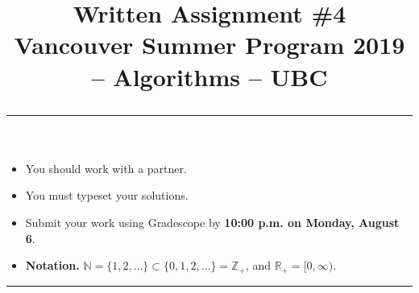 \documentclass[11pt]{article}
\title{
  Written Assignment \#4 \\[0.5em]
  \large
  Vancouver Summer Program 2019 -- Algorithms -- UBC \\
  \vspace*{0.2in} \hrule
}
\date{}
\newcommand{\R}{\mathbb{R}}
\newcommand{\Z}{\mathbb{Z}}
\newcommand{\N}{\mathbb{N}}
\begin{document}
\maketitle

\setlength{\baselineskip}{0.90\baselineskip}




\pagestyle{empty}

\vspace*{-0.75in}

 \straightbraces

\begin{itemize}
\item You should work with a partner.
\item You must typeset your solutions.
\item Submit your work using Gradescope by {\bf 10:00 p.m. on Monday, August 6}.
\item \textbf{Notation.} $\N = \{1,2,\dotsc\} \subset \{0,1,2,\dotsc\} = \Z_{+}$, and $\R_{+} = [0,\infty)$.
\end{itemize}

\hrule
\end{document}
